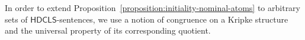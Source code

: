 \documentclass[a4paper,UKenglish,cleveref, autoref]{lipics-v2019}
\newcommand{\HDCLS}{{\mathsf{HDCLS}}}
\renewcommand{\models}{\vDash}
\newcommand{\keyscript}[1]{\text{\normalfont\sffamily\itshape #1}}
\newcommand{\nominal}{\keyscript{n}}
\begin{document}




In order to extend Proposition~\ref{proposition:initiality-nominal-atoms} to arbitrary sets of \(\HDCLS\)-sentences, we use a notion of congruence on a Kripke structure and the universal property of its corresponding quotient.
\end{document}

